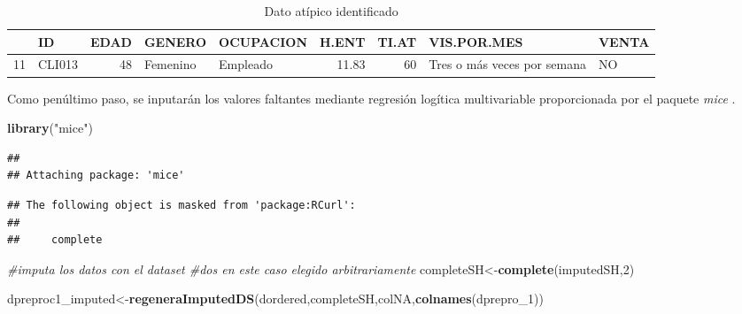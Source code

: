 \documentclass[]{book}
\newenvironment{Shaded}{\begin{snugshade}}{\end{snugshade}}
\newcommand{\KeywordTok}[1]{\textcolor[rgb]{0.13,0.29,0.53}{\textbf{{#1}}}}
\newcommand{\DecValTok}[1]{\textcolor[rgb]{0.00,0.00,0.81}{{#1}}}
\newcommand{\StringTok}[1]{\textcolor[rgb]{0.31,0.60,0.02}{{#1}}}
\newcommand{\CommentTok}[1]{\textcolor[rgb]{0.56,0.35,0.01}{\textit{{#1}}}}
\newcommand{\NormalTok}[1]{{#1}}
\begin{document}
\begin{table}

\caption{\label{tab:dato-atipico}Dato atípico identificado}
\centering
\begin{tabular}[t]{l|l|r|l|l|r|r|l|l}
\hline
  & ID & EDAD & GENERO & OCUPACION & H.ENT & TI.AT & VIS.POR.MES & VENTA\\
\hline
11 & CLI013 & 48 & Femenino & Empleado & 11.83 & 60 & Tres o más veces por semana & NO\\
\hline
\end{tabular}
\end{table}

Como penúltimo paso, se inputarán los valores faltantes mediante
regresión logítica multivariable proporcionada por el paquete
\emph{mice} \citep{mice2011}.

\begin{Shaded}
\begin{Highlighting}[]
\KeywordTok{library}\NormalTok{(}\StringTok{"mice"}\NormalTok{)}
\end{Highlighting}
\end{Shaded}

\begin{verbatim}
## 
## Attaching package: 'mice'
\end{verbatim}

\begin{verbatim}
## The following object is masked from 'package:RCurl':
## 
##     complete
\end{verbatim}

\begin{Shaded}
\end{Shaded}

\begin{Shaded}
\begin{Highlighting}[]
  \CommentTok{#imputa los datos con el dataset #dos en este caso elegido arbitrariamente  }
  \NormalTok{completeSH<-}\KeywordTok{complete}\NormalTok{(imputedSH,}\DecValTok{2}\NormalTok{)}
  
  \NormalTok{dpreproc1_imputed<-}\KeywordTok{regeneraImputedDS}\NormalTok{(dordered,completeSH,colNA,}\KeywordTok{colnames}\NormalTok{(dprepro_1))}
\end{Highlighting}
\end{Shaded}
\end{document}

